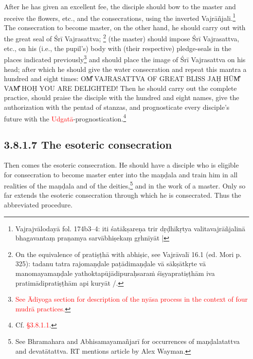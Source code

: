 \documentclass[11pt]{book}
\makeatletter
\def\fakesc#1{%
  \begingroup%
  \xdef\fake@name{\csname\curr@fontshape/\f@size\endcsname}%
  \fontsize{1.3\fontdimen8\fake@name}{\baselineskip}\selectfont%
  \uppercase{#1}%
  \endgroup%
}
\newcommand{\mantra}[1]{\fakesc{#1}}
\newcommand{\red}[1]{\textcolor{red}{#1}}
\makeatother
\begin{document}
After he has given an excellent fee, the disciple should bow to the master and receive the flowers, etc., and the consecrations, using the inverted Vajrāñjali.\footnote{
Vajrajvālodayā fol. 174b3–4: iti śatākṣareṇa trir dṛḍhīkṛtya valitavajrāñjalinā bhagavantaṃ praṇamya sarvābhiṣekaṃ gṛhnīyāt |} The consecration to become master, on the other hand, he should carry out with the great seal of Śrī Vajrasattva;
\footnote{On the equivalence of pratiṣṭhā with abhiṣic, see Vajrāvalī 16.1 (ed. Mori p. 325): tadanu tatra rajomaṇḍale paṭādimaṇḍale vā sākṣātkṛte vā manomayamaṇḍale yathoktapūjādipuraḥsaraṁ śiṣyapratiṣṭhām iva pratimādipratiṣṭhām api kuryāt /.} (the master) should impose Śrī Vajrasattva, etc., on his (i.e., the pupil's) body with (their respective) pledge-seals in the places indicated previously\footnote{\red{See Ādiyoga section for description of the nyāsa process in the context of four mudrā practices.}} and should place the image of Śrī Vajrasattva on his head; after which he should give the water consecration and repeat this mantra a hundred and eight times: \mantra{Om̐ Vajrasattva of great bliss jaḥ hūm̐ vam̐ hoḥ you are delighted!} Then he should carry out the complete practice, should praise the disciple with the hundred and eight names, give the authorization with the pentad of stanzas, and prognosticate every disciple's future with the \red{Udgatā}-prognostication.\footnote{Cf. \red{§3.8.1.1}.}


\subsection{3.8.1.7 The esoteric consecration}

Then comes the esoteric consecration. He should have a disciple who is eligible for consecration to become master enter into the maṇḍala and train him in all realities of the maṇḍala and of the deities,\footnote{See Bhramahara and Abhisamayamañjarī for occurrences of maṇḍalatattva and devatātattva. RT mentions article by Alex Wayman.} and in the work of a master. Only so far extends the esoteric consecration through which he is consecrated. Thus the abbreviated procedure.
\end{document}
